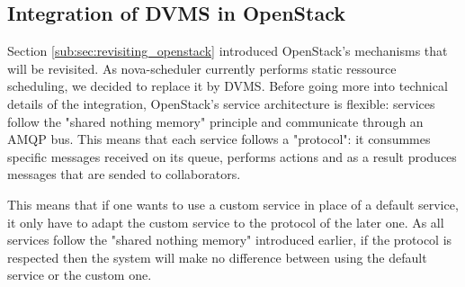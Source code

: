 \subsection{Integration of DVMS in OpenStack}

\label{sub:sec:integration_dvms}







Section \ref{sub:sec:revisiting_openstack} introduced OpenStack's mechanisms 
that will be revisited. As nova-scheduler currently performs static
ressource scheduling, we decided to replace it by DVMS. Before going more into 
technical details of the integration, OpenStack's service architecture is 
flexible: services follow the "shared nothing memory" principle and communicate
through an AMQP bus. This means that each service follows a "protocol": 
it consummes specific messages received on its queue, performs actions and as a
result produces messages that are sended to collaborators.


This means that if one wants to use a custom service in place of a default 
service, it only have to adapt the custom service to the protocol of the later
one. As all services follow the "shared nothing memory" introduced earlier, if 
the protocol is respected then the system will make no difference between using
the default service or the custom one.

